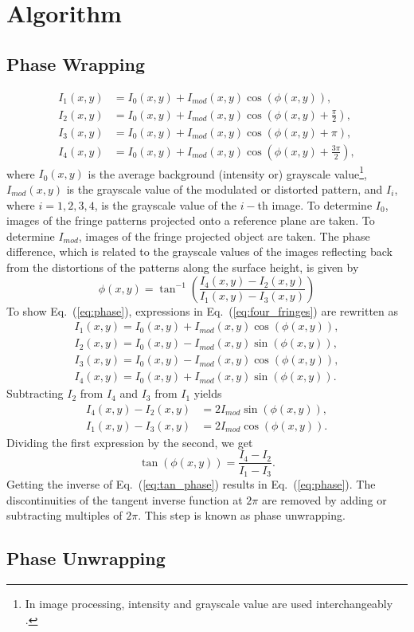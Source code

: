 \section{Algorithm}

\subsection{Phase Wrapping}


\begin{align}
I_1(x,y)&=I_0(x,y) + I_{mod}(x,y)\cos{(\phi(x,y))}, \nonumber\\
I_2(x,y)&=I_0(x,y) + I_{mod}(x,y)\cos{(\phi(x,y)+\frac{\pi}{2})}, \nonumber\\
I_3(x,y)&=I_0(x,y) + I_{mod}(x,y)\cos{(\phi(x,y)+\pi)},\nonumber\\
I_4(x,y)&=I_0(x,y) + I_{mod}(x,y)\cos{(\phi(x,y)+\frac{3\pi}{2})},
\label{eq:four_fringes}
\end{align}  
where $I_0(x,y)$ is the average background (intensity or) grayscale value\footnote{In image processing, intensity and grayscale value are used interchangeably \cite{Gonzales}.}, $I_{mod}(x,y)$ is the grayscale value of the modulated or distorted pattern, and $I_i$, where $i=1,2,3,4$, is the grayscale value of the $i-$th image. To determine $I_0$, images of the fringe patterns projected onto a reference plane are taken. 
To determine $I_{mod}$, images of the fringe projected object are taken. 
The phase difference, which is related to the grayscale values of the images reflecting back from the distortions of the patterns along the surface height, is given by
\begin{equation}
\phi(x,y)=\tan^{-1}{\left( \frac{I_4(x,y) - I_2(x,y)}{I_1(x,y)- I_3(x,y)}\right)}
\label{eq:phase}
\end{equation}
To show Eq.~(\ref{eq:phase}), expressions in Eq.~(\ref{eq:four_fringes}) are rewritten as 
\begin{align}
I_1(x,y)=I_0(x,y) + I_{mod}(x,y)\cos{(\phi(x,y))}, \nonumber\\
I_2(x,y)=I_0(x,y) - I_{mod}(x,y)\sin{(\phi(x,y))}, \nonumber\\
I_3(x,y)=I_0(x,y) - I_{mod}(x,y)\cos{(\phi(x,y))},\nonumber\\
I_4(x,y)=I_0(x,y) + I_{mod}(x,y)\sin{(\phi(x,y))}.
\label{eq:four_fringes2}
\end{align}  
Subtracting $I_2$ from $I_4$ and $I_3$ from $I_1$ yields
\begin{align}
I_4(x,y)-I_2(x,y)&=2I_{mod}\sin{(\phi(x,y))}, \nonumber\\
I_1(x,y)-I_3(x,y)&=2I_{mod}\cos{(\phi(x,y))}.
\end{align}  
Dividing the first expression by the second, we get
\begin{equation}
\tan(\phi(x,y))=\frac{I_4-I_2}{I_1-I_3}.
\label{eq:tan_phase}
\end{equation}
Getting the inverse of Eq.~(\ref{eq:tan_phase}) results in Eq.~(\ref{eq:phase}).  The discontinuities of the tangent inverse function at $2\pi$ are removed by adding or subtracting multiples of $2\pi$.  This step is known as phase unwrapping. 

\subsection{Phase Unwrapping}

